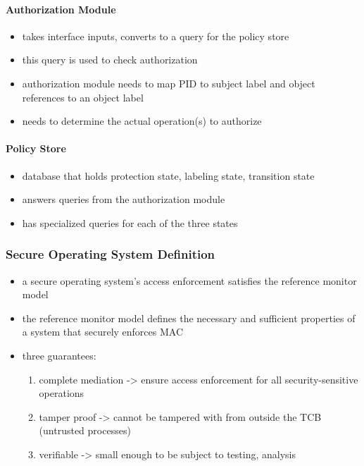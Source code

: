 \documentclass[
  12pt]{findlay}
\providecommand{\tightlist}{%
  \setlength{\itemsep}{0pt}\setlength{\parskip}{0pt}}
\begin{document}
\hypertarget{authorization-module}{%
\paragraph{Authorization Module}\label{authorization-module}}

\begin{itemize}
\tightlist
\item
  takes interface inputs, converts to a query for the policy store
\item
  this query is used to check authorization
\item
  authorization module needs to map PID to subject label and object
  references to an object label
\item
  needs to determine the actual operation(s) to authorize
\end{itemize}

\hypertarget{policy-store}{%
\paragraph{Policy Store}\label{policy-store}}

\begin{itemize}
\tightlist
\item
  database that holds protection state, labeling state, transition state
\item
  answers queries from the authorization module
\item
  has specialized queries for each of the three states
\end{itemize}

\hypertarget{secure-operating-system-definition}{%
\subsubsection{Secure Operating System
Definition}\label{secure-operating-system-definition}}

\begin{itemize}
\tightlist
\item
  a secure operating system's access enforcement satisfies the reference
  monitor model
\item
  the reference monitor model defines the necessary and sufficient
  properties of a system that securely enforces MAC
\item
  three guarantees:

  \begin{enumerate}
  \def\labelenumi{(\arabic{enumi})}
  \tightlist
  \item
    complete mediation -\textgreater{} ensure access enforcement for all
    security-sensitive operations
  \item
    tamper proof -\textgreater{} cannot be tampered with from outside
    the TCB (untrusted processes)
  \item
    verifiable -\textgreater{} small enough to be subject to testing,
    analysis
  \end{enumerate}
\end{itemize}
\end{document}
